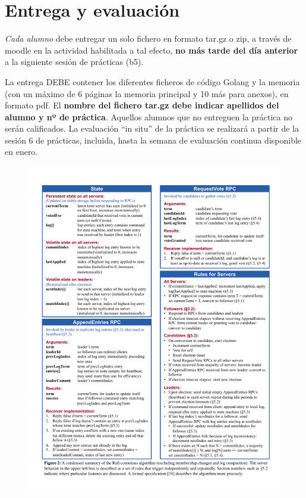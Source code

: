 \documentclass{unizarpractice}
\begin{document}
\section{Entrega y evaluación}

\emph{Cada alumno} debe entregar un solo fichero en formato tar.gz o zip, a través de moodle en la actividad habilitada a tal efecto, \textbf{no más tarde del día anterior} a la siguiente sesión de prácticas (b5).

La entrega DEBE contener los diferentes ficheros de código Golang y la memoria (con un máximo de 6 páginas la memoria principal y 10 más para anexos), en formato pdf. El \textbf{nombre del fichero tar.gz debe indicar apellidos del alumno y nº de práctica}.  Aquellos alumnos que no entreguen la práctica no serán calificados. La evaluación “in  situ”  de  la práctica se realizará a partir de la sesión 6 de prácticas, incluida, hasta la semana de evaluación continua disponible en enero.
\begin{figure}
	\centering
	\includegraphics[width=1.15\linewidth]{RaftExtendedPaperSummary}
	\label{fig:raftextendedpapersummary}
\end{figure}
\end{document}
